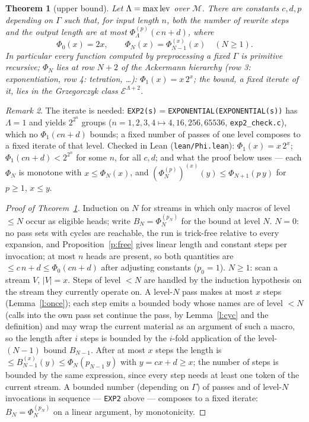 \documentclass[10pt]{article}
\newtheorem{theorem}{Theorem}
\theoremstyle{definition}
\theoremstyle{remark}
\newtheorem{remark}[theorem]{Remark}
\newcommand{\tok}[1]{\texttt{#1}}
\begin{document}
\begin{theorem}[upper bound]\label{t:up}
Let $\Lambda=\max\operatorname{lev}$ over $\mathcal M$. There are constants $c,d,p$ depending on $\Gamma$ such that, for input length
$n$, both the number of rewrite steps and the output length are at most $\Phi_\Lambda^{(p)}(c\,n+d)$, where
\[
\Phi_0(x)=2x,\qquad \Phi_{N}(x)=\Phi_{N-1}^{(x)}(x)\quad(N\ge1).
\]
In particular every function computed by preprocessing a fixed $\Gamma$ is primitive recursive; $\Phi_N$ lies at row
$N+2$ of the Ackermann hierarchy (row 3: exponentiation, row 4: tetration, \dots): $\Phi_1(x)=x\,2^x$; the bound, a
fixed iterate of it, lies in the Grzegorczyk class $\mathcal E^{\Lambda+2}$.
\end{theorem}
\begin{remark}
The iterate is needed: \tok{EXP2(s)}$=$\tok{EXPONENTIAL(EXPONENTIAL(s))} has $\Lambda=1$ and yields $2^{2^n}$ groups
($n=1,2,3,4\mapsto 4,16,256,65536$, \texttt{exp2\_check.c}), which no $\Phi_1(cn+d)$ bounds; a fixed number of passes of
one level composes to a fixed iterate of that level. Checked in Lean (\texttt{lean/Phi.lean}): $\Phi_1(x)=x\,2^x$;
$\Phi_1(cn+d)<2^{2^n}$ for some $n$, for all $c,d$; and what the proof below uses --- each $\Phi_N$ is monotone with
$x\le\Phi_N(x)$, and $(\Phi_N^{(p)})^{(x)}(y)\le\Phi_{N+1}(p\,y)$ for $p\ge1$, $x\le y$.
\end{remark}
\begin{proof}[Proof of Theorem~\ref{t:up}]
Induction on $N$ for streams in which only macros of level $\le N$ occur as eligible heads; write
$B_N=\Phi_N^{(p_N)}$ for the bound at level $N$. $N=0$: no pass sets with
cycles are reachable, the run is trick-free relative to every expansion, and Proposition~\ref{p:free} gives linear length
and constant steps per invocation; at most $n$ heads are present, so both quantities are $\le c\,n+d\le\Phi_0(cn+d)$
after adjusting constants ($p_0=1$). $N\ge1$: scan a stream $V$, $|V|=x$. Steps of level $<N$ are handled by the induction
hypothesis on the stream they currently operate on. A level-$N$ pass makes at most $x$ steps (Lemma~\ref{l:once}); each
step emits a bounded body whose names are of level $<N$ (calls into the own pass set continue the pass, by
Lemma~\ref{l:cyc} and the definition) and may wrap the current material as an argument of such a macro, so the length
after $i$ steps is bounded by the $i$-fold application of the level-$(N-1)$ bound $B_{N-1}$. After at most $x$ steps
the length is $\le B_{N-1}^{(x)}(y)\le\Phi_N(p_{N-1}\,y)$ with $y=cx+d\ge x$; the number of steps is bounded by the same
expression, since every step needs at least one token of the current stream. A bounded number (depending on $\Gamma$) of
passes and of level-$N$ invocations in sequence --- \tok{EXP2} above --- composes to a fixed iterate:
$B_N=\Phi_N^{(p_N)}$ on a linear argument, by monotonicity.
\end{proof}
\end{document}
